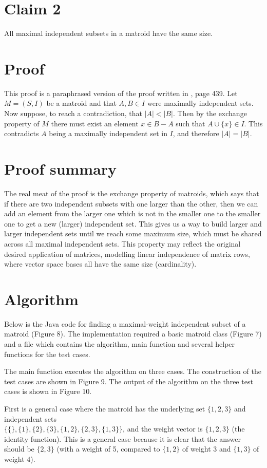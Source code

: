 \documentclass[12pt]{article}
\begin{document}
\newpage
\section*{Claim 2}
All maximal independent subsets in a matroid have the same size.


\section*{Proof}
This proof is a paraphrased version of the proof written in \cite{cormen2009introduction}, page 439. Let $M = (S,I)$ be a matroid and that $A,B \in I$ were maximally independent sets. Now suppose, to reach a contradiction, that $|A| < |B|$. Then by the exchange property of $M$ there must exist an element $x \in B-A$ such that $A \cup \{x\} \in I$. This contradicts $A$ being a maximally independent set in $I$, and therefore $|A| = |B|$. 

\section*{Proof summary}
The real meat of the proof is the exchange property of matroids, which says that if there are two independent subsets with one larger than the other, then we can add an element from the larger one which is not in the smaller one to the smaller one to get a new (larger) independent set. This gives us a way to build larger and larger independent sets until we reach some maximum size, which must be shared across all maximal independent sets. This property may reflect the original desired application of matrices, modelling linear independence of matrix rows, where vector space bases all have the same size (cardinality).

\section*{Algorithm}
Below is the Java code for finding a maximal-weight independent subset of a matroid (Figure 8). The implementation required a basic matroid class (Figure 7) and a file which contains the algorithm, main function and several helper functions for the test cases.

The main function executes the algorithm on three cases. The construction of the test cases are shown in Figure 9. The output of the algorithm on the three test cases is shown in Figure 10.

First is a general case where the matroid has the underlying set $\{1,2,3\}$ and independent sets \\$\{\{\},\{1\},\{2\},\{3\},\{1,2\},\{2,3\},\{1,3\}\}$, and the weight vector is $\{1,2,3\}$ (the identity function). This is a general case because it is clear that the answer should be $\{2,3\}$ (with a weight of 5, compared to $\{1,2\}$ of weight 3 and $\{1,3\}$ of weight 4).  
\end{document}
